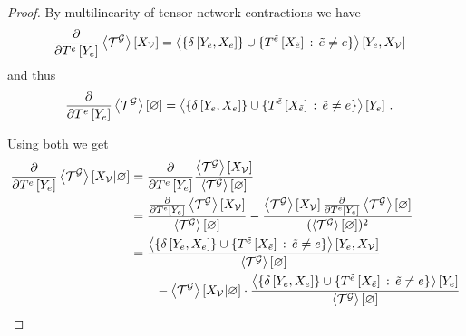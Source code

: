 \begin{proof}
	By multilinearity of tensor network contractions we have
	\begin{align*}
		\frac{\partial }{\partial T^{e}\left[Y_{e}\right]} \left\langle \mathcal{T}^{\mathcal{G}}\right\rangle \left[ X_{\mathcal{V}} \right]
		& = \left\langle \{\delta\left[Y_{e},X_{e}\right]\}\cup\{T^{\tilde{e}}\left[X_{\tilde{e}}\right] \, : \, \tilde{e}\neq e \}\right\rangle \left[ Y_{e},X_{\mathcal{V}} \right]
	\end{align*}
	and thus	
	\begin{align*}
		\frac{\partial }{\partial T^{e}\left[Y_{e}\right]} \left\langle \mathcal{T}^{\mathcal{G}}\right\rangle \left[ \varnothing \right]
		& = \left\langle \{\delta\left[Y_{e},X_{e}\right]\}\cup\{T^{\tilde{e}}\left[X_{\tilde{e}}\right] \, : \, \tilde{e}\neq e \}\right\rangle \left[ Y_{e} \right] \, . 
	\end{align*}
		
	Using both we get
	\begin{align}
		\frac{\partial }{\partial T^{e}\left[Y_{e}\right]} \left\langle \mathcal{T}^{\mathcal{G}}\right\rangle \left[ X_{\mathcal{V}} | \varnothing \right] 
		& = \frac{\partial }{\partial T^{e}\left[Y_{e}\right]}  \frac{\left\langle \mathcal{T}^{\mathcal{G}}\right\rangle \left[ X_{\mathcal{V}} \right]}{\left\langle \mathcal{T}^{\mathcal{G}}\right\rangle \left[ \varnothing \right]} \nonumber \\
		& = \frac{ \frac{\partial }{\partial T^{e}\left[Y_{e}\right]} \left\langle \mathcal{T}^{\mathcal{G}}\right\rangle \left[ X_{\mathcal{V}} \right]}{\left\langle \mathcal{T}^{\mathcal{G}}\right\rangle \left[ \varnothing \right]} 
		- \frac{ \left\langle \mathcal{T}^{\mathcal{G}}\right\rangle \left[ X_{\mathcal{V}} \right] \frac{\partial }{\partial T^{e}\left[Y_{e}\right]} \left\langle \mathcal{T}^{\mathcal{G}}\right\rangle \left[ \varnothing \right] }{(\left\langle \mathcal{T}^{\mathcal{G}}\right\rangle \left[ \varnothing \right])^2} \nonumber \\
		& = \frac{ \left\langle \{\delta\left[Y_{e},X_{e}\right]\}\cup\{T^{\tilde{e}}\left[X_{\tilde{e}}\right] \, : \, \tilde{e}\neq e \}\right\rangle \left[ Y_{e},X_{\mathcal{V}} \right]}{\left\langle \mathcal{T}^{\mathcal{G}}\right\rangle \left[ \varnothing \right]} \nonumber \\
		& \quad\quad - \left\langle \mathcal{T}^{\mathcal{G}}\right\rangle \left[ X_{\mathcal{V}} | \varnothing \right] \cdot  \frac{\left\langle \{\delta\left[Y_{e},X_{e}\right]\}\cup\{T^{\tilde{e}}\left[X_{\tilde{e}}\right] \, : \, \tilde{e}\neq e \}\right\rangle \left[ Y_{e} \right]}{\left\langle \mathcal{T}^{\mathcal{G}}\right\rangle \left[ \varnothing \right]} \label{eq:differentiatingMNpreresult}
	\end{align}
		

\end{proof}
